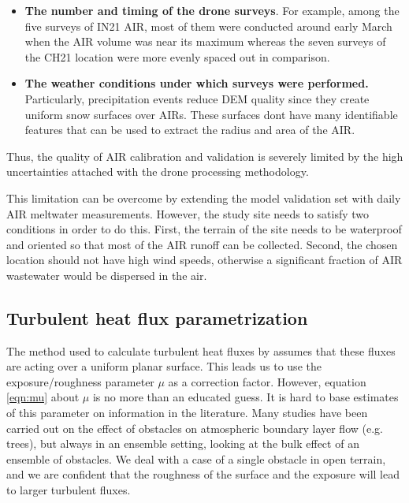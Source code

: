 \begin{itemize}
  \item \textbf{The number and timing of the drone surveys}. For example, among the five surveys of IN21 AIR, most of them were
    conducted around early March when the AIR volume was near its maximum whereas the seven surveys of the CH21
    location were more evenly spaced out in comparison.

  \item \textbf{The weather conditions under which surveys were performed.} Particularly, precipitation events reduce DEM quality since
    they create uniform snow surfaces over \ac{AIRs}. These surfaces dont have many identifiable features that can be
    used to extract the radius and area of the AIR.

\end{itemize}

Thus, the quality of AIR calibration and validation is severely limited by the high uncertainties attached with
the drone processing methodology.

This limitation can be overcome by extending the model validation set with daily AIR meltwater measurements.
However, the study site needs to satisfy two conditions in order to do this. First, the terrain of the site
needs to be waterproof and oriented so that most of the AIR runoff can be collected. Second, the chosen location
should not have high wind speeds, otherwise a significant fraction of AIR wastewater would be dispersed in the
air.

\subsection{Turbulent heat flux parametrization}

The method used to calculate turbulent heat fluxes by \citet{garrattAtmosphericBoundaryLayer1992} assumes that
these fluxes are acting over a uniform planar surface. This leads us to use the exposure/roughness parameter
$\mu$ as a correction factor. However, equation \ref{eqn:mu} about $\mu$ is no more than an educated guess. It
is hard to base estimates of this parameter on information in the literature. Many studies have been carried out
on the effect of obstacles on atmospheric boundary layer flow (e.g. trees), but always in an ensemble setting,
looking at the bulk effect of an ensemble of obstacles. We deal with a case of a single obstacle in open
terrain, and we are confident that the roughness of the surface and the exposure will lead to larger turbulent
fluxes.

